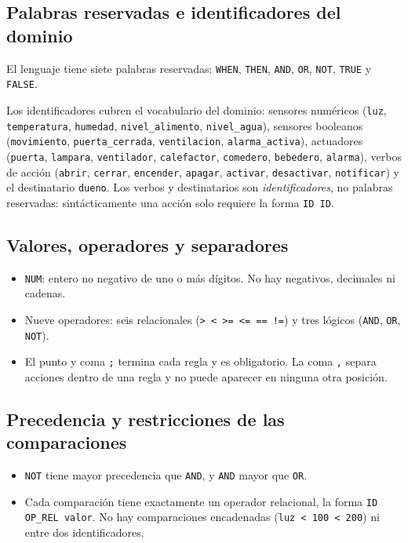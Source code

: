 \documentclass[12pt,a4paper]{article}
\begin{document}
\subsection{Palabras reservadas e identificadores del dominio}
El lenguaje tiene siete palabras reservadas: \texttt{WHEN}, \texttt{THEN},
\texttt{AND}, \texttt{OR}, \texttt{NOT}, \texttt{TRUE} y \texttt{FALSE}.

Los identificadores cubren el vocabulario del dominio: sensores numéricos
(\texttt{luz}, \texttt{temperatura}, \texttt{humedad}, \texttt{nivel\_alimento},
\texttt{nivel\_agua}), sensores booleanos (\texttt{movimiento},
\texttt{puerta\_cerrada}, \texttt{ventilacion}, \texttt{alarma\_activa}),
actuadores (\texttt{puerta}, \texttt{lampara}, \texttt{ventilador},
\texttt{calefactor}, \texttt{comedero}, \texttt{bebedero}, \texttt{alarma}),
verbos de acción (\texttt{abrir}, \texttt{cerrar}, \texttt{encender},
\texttt{apagar}, \texttt{activar}, \texttt{desactivar}, \texttt{notificar}) y
el destinatario \texttt{dueno}. Los verbos y destinatarios son
\emph{identificadores}, no palabras reservadas: sintácticamente una acción
solo requiere la forma \texttt{ID ID}.

\subsection{Valores, operadores y separadores}
\begin{itemize}
  \item \texttt{NUM}: entero no negativo de uno o más dígitos. No hay
        negativos, decimales ni cadenas.
  \item Nueve operadores: seis relacionales (\texttt{> < >= <= == !=}) y tres
        lógicos (\texttt{AND}, \texttt{OR}, \texttt{NOT}).
  \item El punto y coma \texttt{;} termina cada regla y es obligatorio.
        La coma \texttt{,} separa acciones dentro de una regla y no puede
        aparecer en ninguna otra posición.
\end{itemize}

\subsection{Precedencia y restricciones de las comparaciones}
\begin{itemize}
  \item \texttt{NOT} tiene mayor precedencia que \texttt{AND}, y
        \texttt{AND} mayor que \texttt{OR}.
  \item Cada comparación tiene exactamente un operador relacional, la forma
        \texttt{ID OP\_REL valor}. No hay comparaciones encadenadas
        (\texttt{luz < 100 < 200}) ni entre dos identificadores.
\end{itemize}
\end{document}
